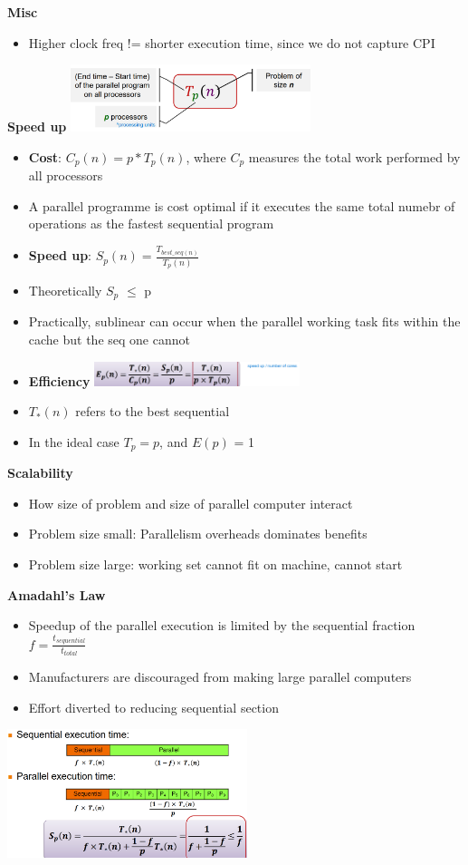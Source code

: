 \documentclass[10pt, landscape]{article}
\begin{document}
\begin{multicols}{4}
\textbf{Misc}
\begin{itemize}
    \item Higher clock freq != shorter execution time, since we do not capture CPI 
\end{itemize}


\textbf{Speed up}
\includegraphics*[width=7cm]{t_p}
\begin{itemize}
    \item \textbf{Cost}: $C_{p}(n)=p*T_{p}(n)$, where $C_{p}$ measures the total work performed by all processors 
    \item A parallel programme is cost optimal if it executes the same total numebr of operations as the fastest sequential program 
    \item \textbf{Speed up}: $S_p(n)=\frac{T_{best\_seq(n)}}{T_p(n)}$
    \item Theoretically $S_p$ $\le$ p
    \item Practically, sublinear can occur when the parallel working task fits within the cache but the seq one cannot 
    \item \textbf{Efficiency}
    \includegraphics*[width=6cm]{efficiency}
    \item $T_*(n)$ refers to the best sequential
    \item In the ideal case $T_p=p$, and $E(p)$ = 1
\end{itemize}

\textbf{Scalability}
\begin{itemize}
    \item How size of problem and size of parallel computer interact 
    \item Problem size small: Parallelism overheads dominates benefits 
    \item Problem size large: working set cannot fit on machine, cannot start
\end{itemize}

\textbf{Amadahl's Law}
\begin{itemize}
    \item Speedup of the parallel execution is limited by the sequential fraction $f= \frac{t_{sequential}}{t_{total}}$
    \item Manufacturers are discouraged from making large parallel computers
    \item Effort diverted to reducing sequential section
\end{itemize}
\includegraphics*[width=7cm]{amdahls.png}


\end{multicols}
\end{document}
